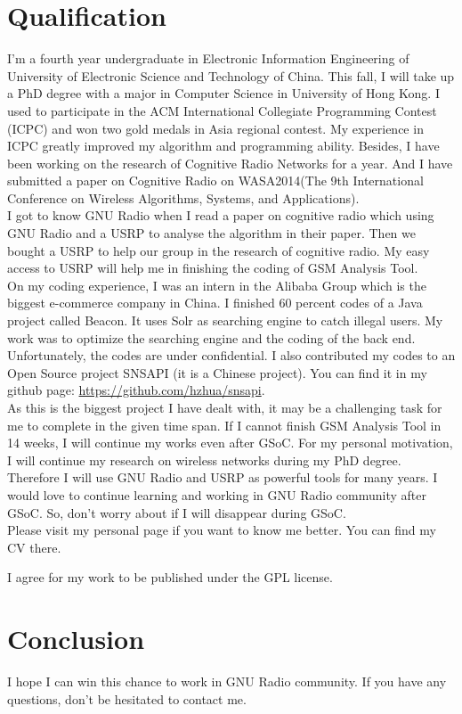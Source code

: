 \documentclass[a4paper,12pt,oneside]{article}
\begin{document}
\section{Qualification}
I'm a fourth year undergraduate in Electronic Information Engineering of University of Electronic Science and Technology of China. This fall, I will take up a PhD degree with a major in Computer Science in University of Hong Kong. I used to participate in the ACM International Collegiate Programming Contest (ICPC) and won two gold medals in Asia regional contest. My experience in ICPC greatly improved my algorithm and programming ability. Besides, I have been working on the research of Cognitive Radio Networks for a year. And I have submitted a paper on Cognitive Radio on WASA2014(The 9th International Conference on Wireless Algorithms, Systems, and Applications). \\

I got to know GNU Radio when I read a paper on cognitive radio which using GNU Radio and a USRP to analyse the algorithm in their paper. Then we bought a USRP to help our group in the research of cognitive radio. My easy access to USRP will help me in finishing the coding of GSM Analysis Tool.\\

On my coding experience, I was an intern in the Alibaba Group which is the biggest e-commerce company in China. I finished 60 percent codes of a Java project called Beacon. It uses Solr as searching engine to catch illegal users. My work was to optimize the searching engine and the coding of the back end. Unfortunately, the codes are under confidential. I also contributed my codes to an Open Source project SNSAPI (it is a Chinese project). You can find it in my github page: {\color{blue}\url{https://github.com/hzhua/snsapi}}.\\

As this is the biggest project I have dealt with, it may be a challenging task for me to complete in the given time span. If I cannot finish GSM Analysis Tool in 14 weeks, I will continue my works even after GSoC. For my personal motivation, I will continue my research on wireless networks during my PhD degree. Therefore I will use GNU Radio and USRP as powerful tools for many years. I would love to continue learning and working in GNU Radio community after GSoC. So, don't worry about if I will disappear during GSoC.\\

Please visit my personal page {} if you want to know me better. You can find my CV there.

I agree for my work to be published under the GPL license.

\section{Conclusion}
I hope I can win this chance to work in GNU Radio community. If you have any questions, don't be hesitated to contact me.

\end{document}
